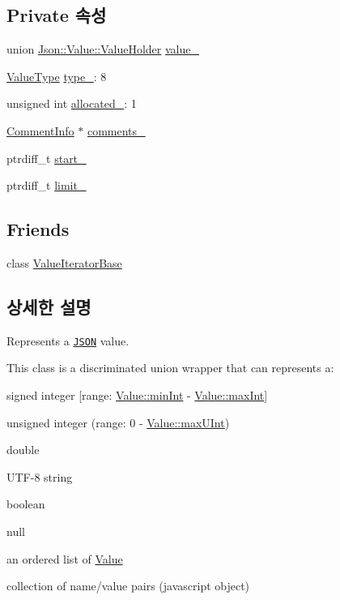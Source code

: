 \subsection*{Private 속성}
\begin{DoxyCompactItemize}
\item 
union \hyperlink{union_json_1_1_value_1_1_value_holder}{Json\+::\+Value\+::\+Value\+Holder} \hyperlink{class_json_1_1_value_aef578244546212705b9f81eb84d7e151}{value\+\_\+}
\item 
\hyperlink{namespace_json_a7d654b75c16a57007925868e38212b4e}{Value\+Type} \hyperlink{class_json_1_1_value_abd222c2536dc88bf330dedcd076d2356}{type\+\_\+}\+: 8
\item 
unsigned int \hyperlink{class_json_1_1_value_ae0126c80dc4907aad94088553fc7632b}{allocated\+\_\+}\+: 1
\item 
\hyperlink{struct_json_1_1_value_1_1_comment_info}{Comment\+Info} $\ast$ \hyperlink{class_json_1_1_value_a2016564cabc7a29208e97bd0b782a4e4}{comments\+\_\+}
\item 
ptrdiff\+\_\+t \hyperlink{class_json_1_1_value_a1c3aeb0fa8fefe93776cb347c76a25a8}{start\+\_\+}
\item 
ptrdiff\+\_\+t \hyperlink{class_json_1_1_value_afe377e25f6d3b5b8ea7221c84f29412a}{limit\+\_\+}
\end{DoxyCompactItemize}
\subsection*{Friends}
\begin{DoxyCompactItemize}
\item 
class \hyperlink{class_json_1_1_value_ad016df56489e5d360735457afba2f649}{Value\+Iterator\+Base}
\end{DoxyCompactItemize}


\subsection{상세한 설명}
Represents a \href{http://www.json.org}{\tt J\+S\+ON} value. 

This class is a discriminated union wrapper that can represents a\+:
\begin{DoxyItemize}
\item signed integer \mbox{[}range\+: \hyperlink{class_json_1_1_value_a7df8a39e2502b8c92a6a41e3d752d2c8}{Value\+::min\+Int} -\/ \hyperlink{class_json_1_1_value_a978c799a8af3114ef7dab6fd0a310a1b}{Value\+::max\+Int}\mbox{]}
\item unsigned integer (range\+: 0 -\/ \hyperlink{class_json_1_1_value_ac79e63ee68d3aa914bfd6988be669b87}{Value\+::max\+U\+Int})
\item double
\item U\+T\+F-\/8 string
\item boolean
\item \textquotesingle{}null\textquotesingle{}
\item an ordered list of \hyperlink{class_json_1_1_value}{Value}
\item collection of name/value pairs (javascript object)
\end{DoxyItemize}

